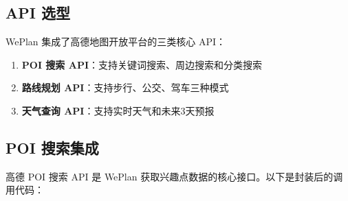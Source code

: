 \documentclass[12pt,a4paper]{ctexart}
\begin{document}
\subsection{API 选型}

WePlan 集成了高德地图开放平台的三类核心 API：

\begin{enumerate}[leftmargin=2em]
  \item \textbf{POI 搜索 API}：支持关键词搜索、周边搜索和分类搜索
  \item \textbf{路线规划 API}：支持步行、公交、驾车三种模式
  \item \textbf{天气查询 API}：支持实时天气和未来3天预报
\end{enumerate}

\subsection{POI 搜索集成}

高德 POI 搜索 API 是 WePlan 获取兴趣点数据的核心接口。以下是封装后的调用代码：
\end{document}
